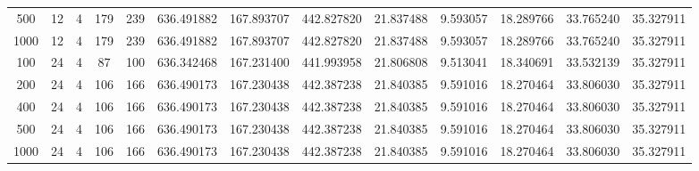 \begin{table}[h]
\begin{tabular}{ccccccccccccc}
500 & 12 & 4 & 179 & 239 & 636.491882 & 167.893707 & 442.827820 & 21.837488 & 9.593057 & 18.289766 & 33.765240 & 35.327911 \\
1000 & 12 & 4 & 179 & 239 & 636.491882 & 167.893707 & 442.827820 & 21.837488 & 9.593057 & 18.289766 & 33.765240 & 35.327911 \\
100 & 24 & 4 & 87 & 100 & 636.342468 & 167.231400 & 441.993958 & 21.806808 & 9.513041 & 18.340691 & 33.532139 & 35.327911 \\
200 & 24 & 4 & 106 & 166 & 636.490173 & 167.230438 & 442.387238 & 21.840385 & 9.591016 & 18.270464 & 33.806030 & 35.327911 \\
400 & 24 & 4 & 106 & 166 & 636.490173 & 167.230438 & 442.387238 & 21.840385 & 9.591016 & 18.270464 & 33.806030 & 35.327911 \\
500 & 24 & 4 & 106 & 166 & 636.490173 & 167.230438 & 442.387238 & 21.840385 & 9.591016 & 18.270464 & 33.806030 & 35.327911 \\
1000 & 24 & 4 & 106 & 166 & 636.490173 & 167.230438 & 442.387238 & 21.840385 & 9.591016 & 18.270464 & 33.806030 & 35.327911 \\
\bottomrule
\end{tabular}
\end{table}
